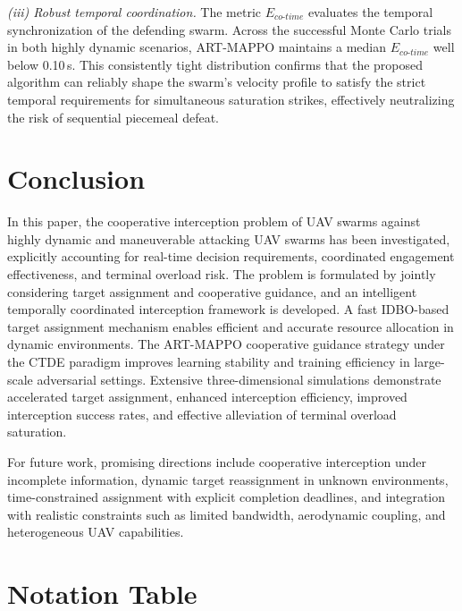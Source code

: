 \documentclass[lettersize,journal]{IEEEtran}
\begin{document}
\emph{(iii) Robust temporal coordination.} The metric $E_{co\text{-}time}$ evaluates the temporal synchronization of the defending swarm. Across the successful Monte Carlo trials in both highly dynamic scenarios, ART-MAPPO maintains a median $E_{co\text{-}time}$ well below 0.10\,s. This consistently tight distribution confirms that the proposed algorithm can reliably shape the swarm's velocity profile to satisfy the strict temporal requirements for simultaneous saturation strikes, effectively neutralizing the risk of sequential piecemeal defeat.



\section{Conclusion}
\label{sec:conclusion}

In this paper, the cooperative interception problem of UAV swarms against highly dynamic and
maneuverable attacking UAV swarms has been investigated, explicitly accounting for real-time
decision requirements, coordinated engagement effectiveness, and terminal overload risk.
The problem is formulated by jointly considering target assignment and cooperative guidance,
and an intelligent temporally coordinated interception framework is developed.
A fast IDBO-based target assignment mechanism enables efficient and accurate resource
allocation in dynamic environments.
The ART-MAPPO cooperative guidance strategy under the CTDE paradigm improves learning
stability and training efficiency in large-scale adversarial settings.
Extensive three-dimensional simulations demonstrate accelerated target assignment, enhanced interception
efficiency, improved interception success rates, and effective alleviation of terminal overload
saturation.

For future work, promising directions include cooperative interception under incomplete
information, dynamic target reassignment in unknown environments, time-constrained assignment
with explicit completion deadlines, and integration with realistic constraints such as
limited bandwidth, aerodynamic coupling, and heterogeneous UAV capabilities.




\appendices
\section{Notation Table}
\label{app:notation}
\end{document}
